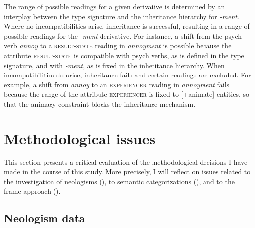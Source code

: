 The range of possible readings for a given derivative is determined by an interplay between the type signature and the inheritance hierarchy for \textit{-ment}. 
Where no incompatibilities arise, inheritance is successful, resulting in a range of possible readings for the \textit{-ment} derivative. 
For instance, a shift from the psych verb \textit{annoy} to a \textsc{result-state} reading in \textit{annoyment} is possible because the attribute \textsc{result-state} is compatible with psych verbs, as is defined in the type signature, and with \textit{-ment}, as is fixed in the inheritance hierarchy. 
When incompatibilities do arise, inheritance fails and certain readings are excluded. 
For example, a shift from \textit{annoy} to an \textsc{experiencer} reading in \textit{annoyment} fails because the range of the attribute \textsc{experiencer} is fixed to [+animate] entities, so that the animacy constraint blocks the inheritance mechanism.  

\section{Methodological issues}
\label{sec:disc-evaluation}
This section presents a critical evaluation of the methodological decisions I have made in the course of this study. More precisely, I will reflect on issues related to the investigation of neologisms (), to semantic categorizations (), and to the frame approach ().

\subsection{Neologism data}
\label{sec:disc-evaluation-neol}

